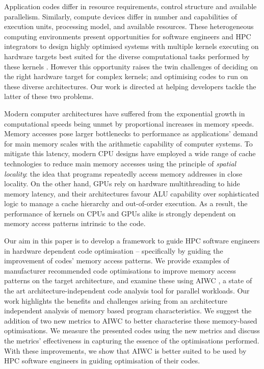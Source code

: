 \documentclass[review=false, sigchi]{acmart}
\begin{document}
	Application codes differ in resource requirements, control structure and available parallelism. Similarly, compute devices differ in number and capabilities of execution units, processing model, and available resources. These heterogeneous computing environments present opportunities for software engineers and HPC integrators to design highly optimised systems with multiple kernels executing on hardware targets best suited for the diverse computational tasks performed by these kernels \cite{spafford2010maestro}.	However this opportunity raises the twin challenges of deciding on the right hardware target for complex kernels; and optimising codes to run on these diverse architectures. Our work is directed at helping developers tackle the latter of these two problems.
	
	Modern computer architectures have suffered from the exponential growth in computational speeds being unmet by proportional increases in memory speeds\cite{hennessycomparch}. Memory accesses pose larger bottlenecks to performance as applications' demand for main memory scales with the arithmetic capability of computer systems. To mitigate this latency, modern CPU designs have employed a wide range of cache technologies to reduce main memory accesses using the principle of \emph{spatial locality}: the idea that programs repeatedly access memory addresses in close locality. On the other hand, GPUs rely on hardware multithreading to hide memory latency, and their architectures favour ALU capability over sophisticated logic to manage a cache hierarchy and out-of-order execution. As a result, the performance of kernels on CPUs and GPUs alike is strongly dependent on memory access patterns intrinsic to the code. %
	
	
	
	Our aim in this paper is to develop a framework to guide HPC software engineers in hardware dependent code optimisation -- specifically by guiding the improvement of codes' memory access patterns. We provide examples of manufacturer recommended code optimisations to improve memory access patterns on the target architecture, and examine these using AIWC \cite{beauaiwc}, a state of the art architecture-independent code analysis tool for parallel workloads. Our work highlights the benefits and challenges arising from an architecture independent analysis of memory based program characteristics. We suggest the addition of two new metrics to AIWC to better characterise these memory-based optimisations. We measure the presented codes using the new metrics and discuss the metrics' effectiveness in capturing the essence of the optimisations performed. With these improvements, we show that AIWC is better suited to be used by HPC software engineers in guiding optimisation of their codes. 
	
\end{document}
